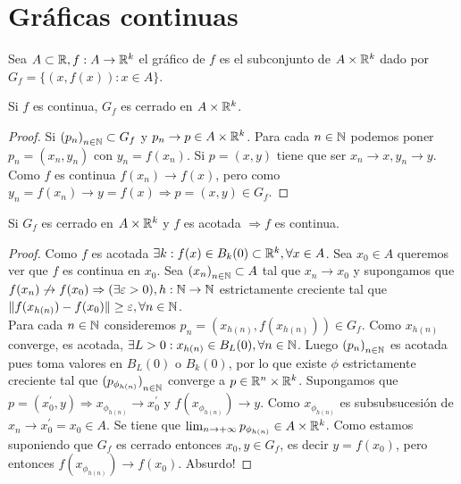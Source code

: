 \section{Gráficas continuas}

\begin{definition}
  Sea \(A \subset \mathbb{R}, f: A \to \mathbb{R}^k\) el gráfico de \(f\) es el subconjunto de \(A \times \mathbb{R}^k\) dado por \(G_f = \{ (x, f(x)) : x \in A \} \).
\end{definition}

\begin{prop}
  Si \(f\) es continua, \(G_f\) es cerrado en \(A \times \mathbb{R}^k\).
  \begin{proof}
    Si \({(p_n)}_{n \in \mathbb{N}} \subset G_f\) y \(p_n \to p \in A \times \mathbb{R}^k\). Para cada \(n \in \mathbb{N} \) podemos poner \(p_n = (x_n, y_n)\) con \(y_n = f(x_n)\). Si \(p = (x, y)\) tiene que ser \(x_n \to x, y_n \to y\). Como \(f\) es continua \(f(x_n) \to f(x)\), pero como \(y_n = f(x_n) \to y = f(x) \Rightarrow p = (x, y) \in G_f\).
  \end{proof}
\end{prop}

\begin{prop}
  Si \(G_f\) es cerrado en \(A \times \mathbb{R}^k\) y \(f\) es acotada \(\Rightarrow f\) es continua.
  \begin{proof}
    Como \(f\) es acotada \(\exists k : f(x) \in B_k(0) \subset \mathbb{R}^k, \forall x \in A\). Sea \(x_0 \in A\) queremos ver que \(f\) es continua en \(x_0\).
    Sea \({(x_n)}_{n \in \mathbb{N}} \subset A\) tal que \(x_n \to x_0\) y supongamos que \(f(x_n) \not \to f(x_0) \Rightarrow (\exists \varepsilon > 0), h: \mathbb{N} \to \mathbb{N} \) estrictamente creciente tal que
    \( \|f(x_{h(n)}) - f(x_0) \| \geq \varepsilon, \forall n \in \mathbb{N} \). \\
    Para cada \(n \in \mathbb{N} \) consideremos \(p_n = (x_{h(n)}, f(x_{h(n)})) \in G_f\). Como \(x_{h(n)} \) converge, es acotada, \(\exists L > 0 : x_{h(n)} \in B_L(0), \forall n \in \mathbb{N} \). Luego \({(p_n)}_{n \in \mathbb{N}} \) es acotada pues toma valores en \(B_L(0)\) o \(B_k(0)\), por lo que existe \(\phi \) estrictamente creciente tal que \({(p_{\phi_{h(n)}})}_{n \in \mathbb{N}} \) converge a \(p \in \mathbb{R}^n \times \mathbb{R}^k\).
    Supongamos que \(p = (x_0^{\prime}, y) \Rightarrow x_{\phi_{h(n)}} \to x_0^{\prime} \) y \(f(x_{\phi_{h(n)}}) \to y\). Como \(x_{\phi_{h(n)}} \) es subsubsucesión de \(x_n \to x_0^{\prime} = x_0 \in A\). Se tiene que \(\lim_{n \to +\infty} p_{\phi_{h(n)}} \in A \times \mathbb{R}^k\). Como estamos suponiendo que \(G_f\) es cerrado entonces \(x_0, y \in G_f\), es decir \(y = f(x_0)\), pero entonces \(f(x_{\phi_{h(n)}}) \to f(x_0)\). Absurdo!
  \end{proof}
\end{prop}

